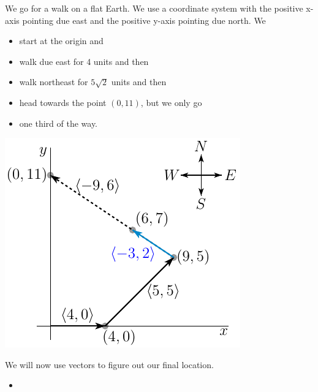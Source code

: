 \begin{eg}\label{eg walk}
We go for a walk on a flat Earth. We use a coordinate system
with the positive x-axis pointing due east and the positive y-axis pointing due
north. We  
\begin{itemize}\itemsep1pt \parskip0pt 
\item
start at the origin and
\item 
walk due east for 4 units and then
\item 
walk northeast for $5\sqrt{2}$ units and then
\item 
head towards the point $(0,11)$, but we only go
\item
one third of the way.
\end{itemize}
      \begin{efig} 
      \begin{center}
      \includegraphics{addSubtractMult.pdf}\qquad\qquad
      \end{center}
      \end{efig}
We will now use vectors to figure out our final location.
\begin{itemize}\itemsep1pt \parskip0pt 
\item

\end{itemize}
\end{eg}
